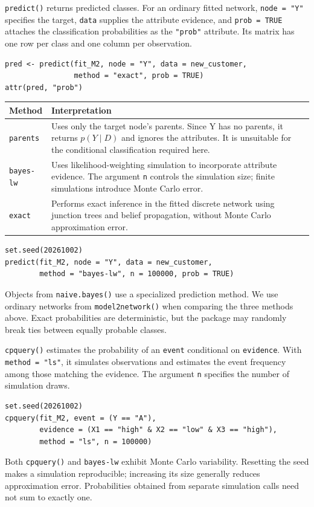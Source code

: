 \documentclass[11pt]{article}
\newcommand{\code}[1]{\texttt{#1}}
\begin{document}
\code{predict()} returns predicted classes. For an ordinary fitted network,
\code{node = "Y"} specifies the target, \code{data} supplies the attribute
evidence, and \code{prob = TRUE} attaches the classification probabilities
as the \code{"prob"} attribute. Its matrix has one row per class and one
column per observation.
\begin{lstlisting}
pred <- predict(fit_M2, node = "Y", data = new_customer,
                method = "exact", prob = TRUE)
attr(pred, "prob")
\end{lstlisting}

\begin{tabularx}{\linewidth}{@{}lX@{}}
\toprule
Method & Interpretation \\
\midrule
\code{parents} & Uses only the target node's parents. Since Y has no
parents, it returns $p(Y\mid D)$ and ignores the attributes. It is
unsuitable for the conditional classification required here. \\[4pt]
\code{bayes-lw} & Uses likelihood-weighting simulation to incorporate
attribute evidence. The argument \code{n} controls the simulation size;
finite simulations introduce Monte Carlo error. \\[4pt]
\code{exact} & Performs exact inference in the fitted discrete network
using junction trees and belief propagation, without Monte Carlo
approximation error. \\
\bottomrule
\end{tabularx}

\begin{lstlisting}
set.seed(20261002)
predict(fit_M2, node = "Y", data = new_customer,
        method = "bayes-lw", n = 100000, prob = TRUE)
\end{lstlisting}
Objects from \code{naive.bayes()} use a specialized prediction method.
We use ordinary networks from \code{model2network()} when comparing
the three methods above. Exact probabilities are deterministic, but
the package may randomly break ties between equally probable classes.

\newpage
\code{cpquery()} estimates the probability of an \code{event} conditional
on \code{evidence}. With \code{method = "ls"}, it simulates observations
and estimates the event frequency among those matching the evidence.
The argument \code{n} specifies the number of simulation draws.
\begin{lstlisting}
set.seed(20261002)
cpquery(fit_M2, event = (Y == "A"),
        evidence = (X1 == "high" & X2 == "low" & X3 == "high"),
        method = "ls", n = 100000)
\end{lstlisting}
Both \code{cpquery()} and \code{bayes-lw} exhibit Monte Carlo variability.
Resetting the seed makes a simulation reproducible; increasing its size
generally reduces approximation error. Probabilities obtained from
separate simulation calls need not sum to exactly one.
\end{document}
